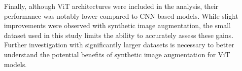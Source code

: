 \documentclass [MAS] {uclathes}
\begin{document}
Finally, although ViT architectures were included in the analysis, their performance was notably lower compared to 
CNN-based models. While slight improvements were observed with synthetic image augmentation, the small dataset used in 
this study limits the ability to accurately assess these gains. Further investigation with significantly larger datasets 
is necessary to better understand the potential benefits of synthetic image augmentation for ViT models.




\end{document}
